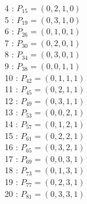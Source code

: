 \documentclass{article}
\begin{document}
{\begin{multicols}{3}
4 : $P_{15}=( 0, 2, 1, 0 )$\\
5 : $P_{19}=( 0, 3, 1, 0 )$\\
6 : $P_{26}=( 0, 1, 0, 1 )$\\
7 : $P_{30}=( 0, 2, 0, 1 )$\\
8 : $P_{34}=( 0, 3, 0, 1 )$\\
9 : $P_{38}=( 0, 0, 1, 1 )$\\
10 : $P_{42}=( 0, 1, 1, 1 )$\\
11 : $P_{45}=( 0, 2, 1, 1 )$\\
12 : $P_{49}=( 0, 3, 1, 1 )$\\
13 : $P_{53}=( 0, 0, 2, 1 )$\\
14 : $P_{57}=( 0, 1, 2, 1 )$\\
15 : $P_{61}=( 0, 2, 2, 1 )$\\
16 : $P_{65}=( 0, 3, 2, 1 )$\\
17 : $P_{69}=( 0, 0, 3, 1 )$\\
18 : $P_{73}=( 0, 1, 3, 1 )$\\
19 : $P_{77}=( 0, 2, 3, 1 )$\\
20 : $P_{81}=( 0, 3, 3, 1 )$\\
\end{multicols}


%


%


}%
\end{document}
